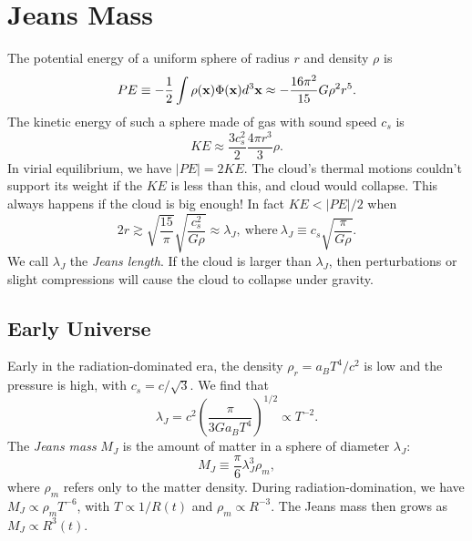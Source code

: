 \documentclass[]{article}
\begin{document}
\section{Jeans Mass}

The potential energy of a uniform sphere of radius $r$ and
density $\rho$ is
\begin{equation}
PE \equiv -\frac{1}{2}\int \rho(\mathbf{x})\Phi(\mathbf{x})d^3\mathbf{x} \approx - \frac{16\pi^2}{15}G\rho^2 r^5.
\end{equation}
\noindent
The kinetic energy of such a sphere made of gas with sound
speed $c_s$ is
\begin{equation}
KE \approx \frac{3c_s^2}{2}\frac{4\pi r^3}{3}\rho.
\end{equation}
In virial equilibrium, we have $|PE| = 2 KE$.  The
cloud's thermal motions couldn't support its weight if
the $KE$ is less than this, and cloud would collapse.
This always happens if the cloud is big enough!  In
fact $KE < |PE|/2$ when
\begin{equation}
2r \gtrsim \sqrt{\frac{15}{\pi}}\sqrt{\frac{c_s^2}{G\rho}}\approx\lambda_J,~\mathrm{where}~\lambda_J\equiv c_s\sqrt{\frac{\pi}{G\rho}}.
\end{equation}
\noindent
We call $\lambda_J$ the {\it Jeans length}.  If the cloud
is larger than $\lambda_J$, then perturbations or slight compressions
will cause the cloud to collapse under gravity.

\subsection{Early Universe}
Early in the radiation-dominated era, the
density $\rho_r = a_B T^4 / c^2$ is low and the
pressure is high, with $c_s = c/\sqrt{3}$.  We
find that
\begin{equation}
\lambda_J = c^2\left(\frac{\pi}{3Ga_BT^4}\right)^{1/2} \propto T^{-2}.
\end{equation}
\noindent
The {\it Jeans mass} $M_J$ is the amount of matter in a sphere of 
diameter $\lambda_J$:
\begin{equation}
M_J \equiv \frac{\pi}{6} \lambda_J^3 \rho_m,
\end{equation}
\noindent
where $\rho_m$ refers only to the matter density.
During radiation-domination, we have $M_J\propto\rho_m T^{-6}$,
with $T\propto 1/R(t)$ and $\rho_m \propto R^{-3}$.  The
Jeans mass then grows as $M_J \propto R^3(t)$.
\end{document}

